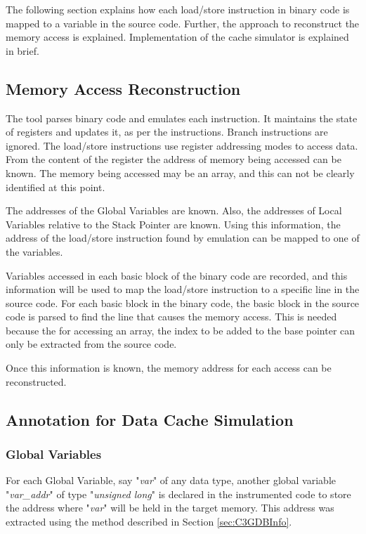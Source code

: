 The following section explains how each load/store instruction in binary code is mapped to a variable in the source code. Further, the approach to reconstruct the memory access is explained. Implementation of the cache simulator is explained in brief.

\subsection{Memory Access Reconstruction}
The tool parses binary code and emulates each instruction. It maintains the state of registers and updates it, as per the instructions. Branch instructions are ignored. The load/store instructions use register addressing modes to access data. From the content of the register the address of memory being accessed can be known. The memory being accessed may be an array, and this can not be clearly identified at this point.

The addresses of the Global Variables are known. Also, the addresses of Local Variables relative to the Stack Pointer are known. Using this information, the address of the load/store instruction found by emulation can be mapped to one of the variables.

Variables accessed in each basic block of the binary code are recorded, and this information will be used to map the load/store instruction to a specific line in the source code. For each basic block in the binary code, the basic block in the source code is parsed to find the line that causes the memory access. This is needed because the for accessing an array, the index to be added to the base pointer can only be extracted from the source code. 

Once this information is known, the memory address for each access can be reconstructed.

\subsection{Annotation for Data Cache Simulation}
\subsubsection{Global Variables}
For each Global Variable, say "\textit{var}" of any data type, another global variable "\textit{var\_addr}" of type "\textit{unsigned long}" is declared in the instrumented code to store the address where "\textit{var}" will be held in the target memory. This address was extracted using the method described in Section \ref{sec:C3GDBInfo}.

